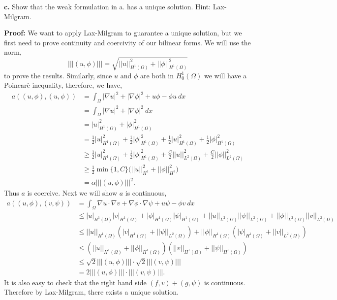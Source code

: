 \documentclass[11pt]{article}
\begin{document}
\vskip 2cm


\textbf{c.} Show that the weak formulation in a. has a unique solution. Hint: Lax-Milgram.

\vskip 1cm 


\textbf{Proof:} We want to apply Lax-Milgram to guarantee a unique solution, but we first need to prove continuity and coercivity of our bilinear forms.
We will use the norm,
\begin{equation}
    |||(u,\phi)||| = \sqrt{||u||^2_{H^1(\Omega)} + ||\phi||^2_{H^1(\Omega)} }
\end{equation}
to prove the results. Similarly, since $u$ and $\phi$ are both in $H^1_0(\Omega)$ we will have a Poincar\`{e} inequality, therefore, we have,
\begin{align*}
    a((u,\phi),(u,\phi)) &= \int_\Omega |\nabla u|^2 + |\nabla \phi|^2 + u\phi - \phi u \: dx \\
    &= \int_\Omega |\nabla u|^2 + |\nabla \phi|^2 \: dx \\
    &= |u|^2_{H^1(\Omega)} + |\phi|^2_{H^1(\Omega)} \\
    &= \frac{1}{2}|u|^2_{H^1(\Omega)} + \frac{1}{2}|\phi|^2_{H^1(\Omega)} + \frac{1}{2}|u|^2_{H^1(\Omega)} + \frac{1}{2}|\phi|^2_{H^1(\Omega)} \\
    &\geq \frac{1}{2}|u|^2_{H^1(\Omega)} + \frac{1}{2}|\phi|^2_{H^1(\Omega)} + \frac{C}{2} ||u||^2_{L^2(\Omega)} + \frac{C}{2} ||\phi||^2_{L^2(\Omega)} \\
    &\geq \frac{1}{2} \min \{ 1, C \} \big( ||u||^2_{H^1} + ||\phi||^2_{H^1} \big) \\
    &= \alpha |||(u,\phi)|||^2.
\end{align*}
Thus $a$ is coercive. 
Next we will show $a$ is continuous,
\begin{align*}
    a((u,\phi),(v,\psi)) &= \int_\Omega \nabla u \cdot \nabla v + \nabla \phi \cdot \nabla \psi + u\psi - \phi v \: dx \\
    &\leq |u|_{H^1(\Omega)} |v|_{H^1(\Omega)} + |\phi|_{H^1(\Omega)} |\psi|_{H^1(\Omega)} + ||u||_{L^2(\Omega)} ||\psi||_{L^2(\Omega)} + ||\phi||_{L^2(\Omega)} ||v||_{L^2(\Omega)} \\
    &\leq ||u||_{H^1(\Omega)} ( |v|_{H^1(\Omega)} + ||\psi||_{L^2(\Omega)}) + ||\phi||_{H^1(\Omega)}(|\psi|_{H^1(\Omega)} + ||v||_{L^2(\Omega)}) \\
    &\leq (||u||_{H^1(\Omega)} + ||\phi||_{H^1(\Omega)})( ||v||_{H^1(\Omega)} + ||\psi||_{H^1(\Omega)}) \\
    &\leq \sqrt{2} |||(u,\phi)||| \cdot \sqrt{2} |||(v,\psi)||| \\
    &= 2 |||(u,\phi)||| \cdot |||(v,\psi)|||.
\end{align*}
It is also easy to check that the right hand side $(f,v) + (g,\psi)$ is continuous.
Therefore by Lax-Milgram, there exists a unique solution.
\end{document}
